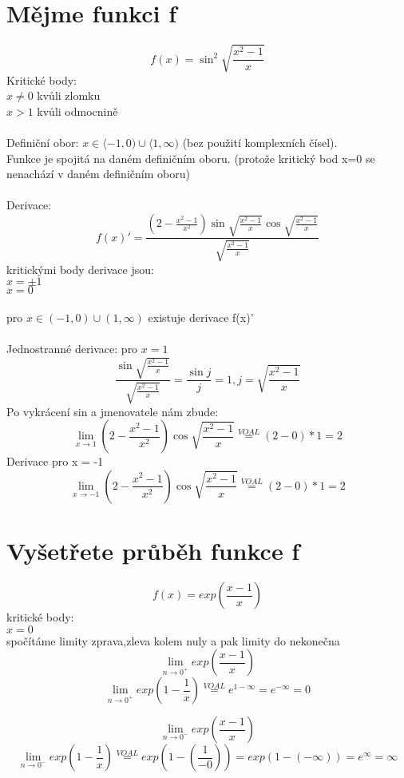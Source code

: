 \documentclass[a4paper,titlepage]{article}
\begin{document}
\section{Mějme funkci f}
$$
f(x)=\sin^2 \sqrt{\frac{x^2-1}{x}}
$$
Kritické body:\\
$ x \neq 0 $ kvůli zlomku\\
$ x > 1 $ kvůli odmocnině\\
\\
Definiční obor: $x \in \langle -1,0 ) \cup \langle 1,\infty )$ (bez použití komplexních čísel).\\
Funkce je spojitá na daném definičním oboru. (protože kritický bod x=0 se nenachází v daném definičním oboru)\\
\\
Derivace:
$$
f(x)'=\frac{	(2-\frac{x^2-1}{x^2})	\sin \sqrt{\frac{x^2-1}{x}}\cos \sqrt{\frac{x^2-1}{x}}}{\sqrt{\frac{x^2-1}{x}}}
$$
kritickými body derivace jsou:\\
$x = \pm 1$\\
$x= 0$\\
\\
pro $x \in ( -1,0 ) \cup (1,\infty)$ existuje derivace f(x)'\\
\\
Jednostranné derivace: pro $x = 1$
$$
\frac{	\sin \sqrt{\frac{x^2-1}{x}}}{\sqrt{\frac{x^2-1}{x}}} = \frac{\sin j}{j} = 1, j = \sqrt{\frac{x^2-1}{x}}
$$
Po vykrácení sin a jmenovatele nám zbude:
$$
\lim_{x \to 1}(2-\frac{x^2-1}{x^2})\cos \sqrt{\frac{x^2-1}{x}} \stackrel{VOAL}{=} (2-0) * 1 = 2
$$
Derivace pro x = -1
$$
\lim_{x \to -1}(2-\frac{x^2-1}{x^2})\cos \sqrt{\frac{x^2-1}{x}} \stackrel{VOAL}{=} (2-0) * 1 = 2
$$







\section{Vyšetřete průběh funkce f}
$$
f(x)=exp(\frac{x-1}{x})
$$
kritické body:\\
$x = 0$\\
spočítáme limity zprava,zleva kolem nuly a pak limity do nekonečna
$$
\lim_{n \to 0^+}exp(\frac{x-1}{x})
$$ $$
\lim_{n \to 0^+}exp(1-\frac{1}{x}) \stackrel{VOAL}{=} e^{1-\infty} = e^{-\infty} = 0
$$ 

$$
\lim_{n \to 0^-}exp(\frac{x-1}{x})
$$ $$
\lim_{n \to 0^-}exp(1-\frac{1}{x}) \stackrel{VOAL}{=} exp(1-(\frac{1}{-0})) = exp(1-(-\infty))  = e^{\infty} = \infty
$$ 
\end{document}
